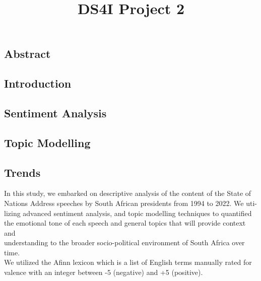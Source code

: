 \documentclass[
  letterpaper,
  DIV=11,
  numbers=noendperiod]{scrartcl}
\title{DS4I Project 2}
\author{}
\date{}
\renewcommand*\contentsname{Table of contents}
\newcommand\contentsname{Table of contents}
\begin{document}
\maketitle
\ifdefined\Shaded\renewenvironment{Shaded}{\begin{tcolorbox}[interior hidden, sharp corners, borderline west={3pt}{0pt}{shadecolor}, breakable, frame hidden, boxrule=0pt, enhanced]}{\end{tcolorbox}}\fi

\renewcommand*\contentsname{Table of contents}
{
\hypersetup{linkcolor=}
\setcounter{tocdepth}{3}
\tableofcontents
}
\hypertarget{abstract}{%
\subsection{Abstract}\label{abstract}}

\hypertarget{introduction}{%
\subsection{Introduction}\label{introduction}}

\hypertarget{sentiment-analysis}{%
\subsection{Sentiment Analysis}\label{sentiment-analysis}}

\hypertarget{topic-modelling}{%
\subsection{Topic Modelling}\label{topic-modelling}}

\hypertarget{trends}{%
\subsection{Trends}\label{trends}}

In this study, we embarked on descriptive analysis of the content of the
State of\\
Nations Address speeches by South African presidents from 1994 to 2022.
We uti-\\
lizing advanced sentiment analysis, and topic modelling techniques to
quantified\\
the emotional tone of each speech and general topics that will provide
context and\\
understanding to the broader socio-political environment of South Africa
over time.\\
We utilized the Afinn lexicon which is a list of English terms manually
rated for\\
valence with an integer between -5 (negative) and +5 (positive).
\end{document}
